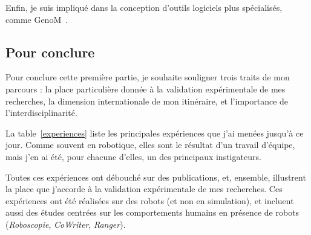 \documentclass[a4paper]{article}
\begin{document}
Enfin, je suis impliqué dans la conception d'outils logiciels plus spécialisés,
comme GenoM~\cite{mallet2010genom3}.

\subsection*{Pour conclure}

Pour conclure cette première partie, je souhaite souligner trois traits de mon
parcours : la place particulière donnée à la validation expérimentale de mes
recherches, la dimension internationale de mon itinéraire, et l'importance de
l'interdisciplinarité.

La table~\ref{experiences} liste les principales expériences que j'ai menées
jusqu'à ce jour. Comme souvent en robotique, elles sont le résultat
d'un travail d'équipe, mais j'en ai été, pour chacune d'elles, un des
principaux instigateurs.

Toutes ces expériences ont débouché sur des publications, et, ensemble, illustrent la place que
j'accorde à la validation expérimentale de mes recherches. Ces expériences ont
été réalisées sur des robots (et non en simulation), et incluent aussi des
études centrées sur les comportements humains en présence de robots
(\emph{Roboscopie}, \emph{CoWriter}, \emph{Ranger}).
\end{document}
